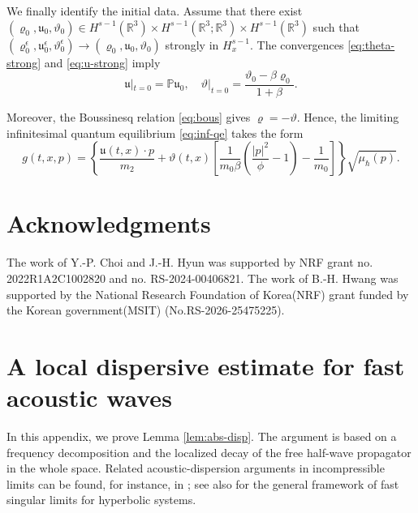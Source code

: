 \documentclass[10pt,reqno]{amsart}
\numberwithin{equation}{section}
\newcommand{\lt}{\left}
\newcommand{\rt}{\right}
\newcommand{\mP}{\mathbb{P}}
\newcommand{\vrh}{\varrho}
\newcommand{\vth}{\vartheta}
\newcommand{\mfu}{\mathfrak{u}}
\newcommand{\R}{\mathbb R}
\begin{document}
We finally identify the initial data. Assume that there exist $(\vrh_0,\mfu_0,\vth_0)\in H^{s-1}(\R^3)\times H^{s-1}(\R^3;\R^3)\times H^{s-1}(\R^3)$ such that $\lt(\vrh^\epsilon_0,\mfu^\epsilon_0,\vth^\epsilon_0\rt)\to\lt(\vrh_0,\mfu_0,\vth_0\rt)$ strongly in $H^{s-1}_x$.  The convergences \eqref{eq:theta-strong} and \eqref{eq:u-strong} imply
\[
\mfu|_{t=0}=\mP\mfu_0, \quad \vth|_{t=0}=\frac{\vth_0-\beta \vrh_0}{1+\beta }.
\]

Moreover, the Boussinesq relation \eqref{eq:bous} gives $\vrh=-\vth$. Hence, the limiting infinitesimal quantum equilibrium \eqref{eq:inf-qe} takes the form
\[
g(t,x,p)=\lt\{\frac{\mfu(t,x)\cdot p}{m_2 }+\vth(t,x)\lt[\frac{1}{m_0\beta}\lt(\frac{|p|^2}{\phi }-1\rt)-\frac{1}{m_0 }\rt]\rt\}\sqrt{\mu_\hbar(p)}.
\]

 

%
%
%
%
%
%
%
%
%
%

\section*{Acknowledgments}
 The work of Y.-P. Choi and J.-H. Hyun was supported by NRF grant no. 2022R1A2C1002820 and no. RS-2024-00406821. The work of B.-H. Hwang was supported by the National Research Foundation of Korea(NRF) grant funded by the Korean government(MSIT) (No.RS-2026-25475225).
 
 
 
%
%
%
%
%
%
%
%
%
%
\appendix

\section{A local dispersive estimate for fast acoustic waves}\label{app:acoustic}

In this appendix, we prove Lemma \ref{lem:abs-disp}. The argument is based on a frequency decomposition and the localized decay of the free half-wave propagator in the whole space. Related acoustic-dispersion arguments in incompressible limits can be found, for instance, in \cite{MS01}; see also \cite{Sch94} for the general framework of fast singular limits for hyperbolic systems.
\end{document}
